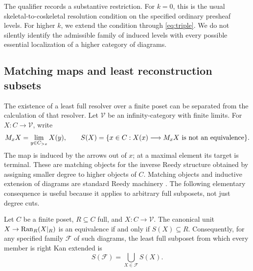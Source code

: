 The qualifier records a substantive restriction. For $k=0$, this is the
usual skeletal-to-coskeletal resolution condition on the specified ordinary
presheaf levels. For higher $k$, we extend the condition through
\eqref{eq:triple}. We do not silently identify the admissible family of
induced levels with every possible essential localization of a higher
category of diagrams.

\subsection{Matching maps and least reconstruction subsets}
\label{sec:matching}

The existence of a least full resolver over a finite poset can be
separated from the calculation of that resolver. Let $\mathcal V$ be an
infinity-category with finite limits. For $X:C\to\mathcal V$, write
\begin{equation}\label{eq:matchingsupport}
M_xX=\operatorname*{lim}_{y\in C_{>x}}X(y),\qquad
S(X)=\{x\in C:X(x)\longrightarrow M_xX\text{ is not an equivalence}\}.
\end{equation}
The map is induced by the arrows out of $x$; at a maximal element its
target is terminal. These are matching objects for the inverse Reedy
structure obtained by assigning smaller degree to higher objects of
$C$. Matching objects and inductive extension of diagrams are standard
Reedy machinery \cite[section 3]{RiehlVerity}. The following elementary
consequence is useful because it applies to arbitrary full subposets,
not just degree cuts.

\begin{proposition}\label{prop:support}
Let $C$ be a finite poset, $R\subseteq C$ full, and
$X:C\to\mathcal V$. The canonical unit
$X\to\operatorname{Ran}_R(X|_R)$ is an equivalence if and only if $S(X)\subseteq R$.
Consequently, for any specified family $\mathcal F$ of such diagrams,
the least full subposet from which every member is right Kan extended is
\begin{equation}\label{eq:familysupport}
S(\mathcal F)=\bigcup_{X\in\mathcal F}S(X).
\end{equation}
\end{proposition}

